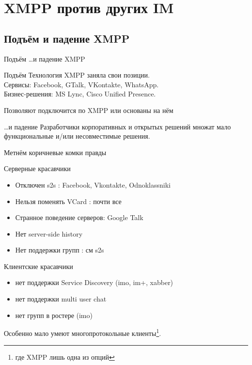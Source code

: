 \section{XMPP против других IM}

\subsection{Подъём и падение XMPP}
\begin{frame}{Подъём \ldots и падение XMPP}
  \begin{block}{Подъём}
    Технология XMPP заняла свои позиции. \\
    Сервисы: Facebook, GTalk, VKontakte, WhatsApp. \\
    Бизнес-решения: MS Lync, Cisco Unified Presence.

    Позволяют подключится по XMPP или основаны на нём
  \end{block} \pause

  \begin{block}{\ldots и падение}
    Разработчики корпоративных и открытых решений множат мало функциональные и/или несовместимые решения.
  \end{block}
\end{frame}

\begin{frame}{Метнём коричневые комки правды}
  \begin{block}{Серверные красавчики}
    \begin{itemize}
      \item Отключен s2s : Facebook, Vkontakte, Odnoklassniki
      \item Нельзя поменять VCard : почти все
      \item Странное поведение серверов: Google Talk
      \item Нет server-side history
      \item Нет поддержки групп : см s2s
    \end{itemize} 
  \end{block}\pause

  \begin{block}{Клиентские красавчики}
    \begin{itemize}
      \item нет поддержки Service Discovery (imo, im+, xabber)
      \item нет поддержки multi user chat
      \item нет групп в ростере (imo)
    \end{itemize}
    Особенно мало умеют многопротокольные клиенты\footnote{где XMPP лишь одна из опций}.
  \end{block}
\end{frame}

